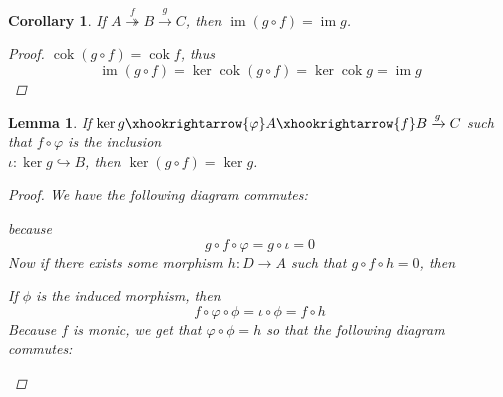 \documentclass{article}
\DeclareMathOperator{\im}{\mathrm{im}}
\DeclareMathOperator{\cok}{\mathrm{cok}}
\newtheorem{corollary}{Corollary}[theorem]
\newtheorem{lemma}[theorem]{Lemma}
\begin{document}
    \begin{corollary}\label{cor:comp with epic and im}
    If $A\overset{f}\twoheadrightarrow B \xrightarrow{g} C$, then $\im (g\circ f)=\im g$.
    \begin{proof}
        $\cok (g\circ f)=\cok f$, thus
        \[
        \im (g\circ f)=\ker \cok (g\circ f)=\ker \cok g=\im g
        \]
    \end{proof}
\end{corollary}
\begin{lemma}\label{lem:double comp with monic and ker}
    If $\ker g \xhookrightarrow{\varphi} A\xhookrightarrow{f}B \xrightarrow[]{g}C$ such that $f\circ \varphi$ is the inclusion\\  $\iota:\ker g\hookrightarrow B$, then $\ker (g\circ f)=\ker g$.
    \begin{proof}
        We have the following diagram commutes:
        \begin{center}
        \end{center}
        because
        \[
        g\circ f\circ \varphi=g\circ \iota=0
        \]
        Now if there exists some morphism $h:D\to A$ such that $g\circ f \circ h=0$, then
        \begin{center}
        \end{center}
        If $\phi$ is the induced morphism, then 
        \[
        f\circ \varphi\circ \phi=\iota\circ \phi=f\circ h
        \]
        Because $f$ is monic, we get that $\varphi \circ \phi=h$ so that the following diagram commutes:
        \begin{center}
        \end{center}
    \end{proof}
\end{lemma}
\end{document}

